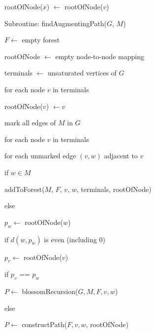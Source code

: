 \documentclass{article}
\begin{document}
\hspace{1cm} rootOfNode($x$) $\leftarrow$ rootOfNode($v$)

\vspace{0.5cm}




Subroutine: findAugmentingPath($G$, $M$) \dotfill

\hspace{1cm} $F \leftarrow$ empty forest

\hspace{1cm} rootOfNode $\leftarrow$ empty node-to-node mapping

\hspace{1cm} terminals $\leftarrow$ unsaturated vertices of $G$

\hspace{1cm} for each node $v$ in terminals

\hspace{2cm} rootOfNode($v$) $\leftarrow v$

\hspace{1cm} mark all edges of $M$ in $G$

\hspace{1cm} for each node $v$ in terminals

\hspace{2cm} for each unmarked edge $(v, w)$ adjacent to $v$

\hspace{3cm} if $w \in M$

\hspace{4cm} addToForest($M$, $F$, $v$, $w$, terminals, rootOfNode)

\hspace{3cm} else 

\hspace{4cm} $p_w \leftarrow$ rootOfNode($w$)

\hspace{4cm} if $d(w, p_w)$ is even (including 0)

\hspace{5cm} $p_v \leftarrow$ rootOfNode($v$)

\hspace{5cm} if $p_v$ == $p_w$

\hspace{6cm} $P \leftarrow$ blossomRecursion($G, M, F, v, w$)

\hspace{5cm} else 

\hspace{6cm} $P \leftarrow$ constructPath($F, v, w$, rootOfNode)
\end{document}
